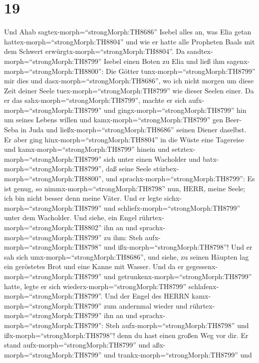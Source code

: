 \hypertarget{section-18}{%
\section{19}\label{section-18}}

 Und Ahab sagtex-morph=``strongMorph:TH8686'' Isebel alles
an, was Elia getan hattex-morph=``strongMorph:TH8804'' und wie er hatte
alle Propheten Baals mit dem Schwert
erwürgtx-morph=``strongMorph:TH8804''.  Da
sandtex-morph=``strongMorph:TH8799'' Isebel einen Boten zu Elia und ließ
ihm sagenx-morph=``strongMorph:TH8800'': Die Götter
tunx-morph=``strongMorph:TH8799'' mir dies und
dasx-morph=``strongMorph:TH8686'', wo ich nicht morgen um diese Zeit
deiner Seele tuex-morph=``strongMorph:TH8799'' wie dieser Seelen einer.
 Da er das sahx-morph=``strongMorph:TH8799'', machte er sich
aufx-morph=``strongMorph:TH8799'' und gingx-morph=``strongMorph:TH8799''
hin um seines Lebens willen und kamx-morph=``strongMorph:TH8799'' gen
Beer-Seba in Juda und ließx-morph=``strongMorph:TH8686'' seinen Diener
daselbst.  Er aber ging hinx-morph=``strongMorph:TH8804'' in
die Wüste eine Tagereise und kamx-morph=``strongMorph:TH8799'' hinein
und setztex-morph=``strongMorph:TH8799'' sich unter einen Wacholder und
batx-morph=``strongMorph:TH8799'', daß seine Seele
stürbex-morph=``strongMorph:TH8800'', und
sprachx-morph=``strongMorph:TH8799'': Es ist genug, so
nimmx-morph=``strongMorph:TH8798'' nun, HERR, meine Seele; ich bin nicht
besser denn meine Väter.  Und er legte
sichx-morph=``strongMorph:TH8799'' und
schliefx-morph=``strongMorph:TH8799'' unter dem Wacholder. Und siehe,
ein Engel rührtex-morph=``strongMorph:TH8802'' ihn an und
sprachx-morph=``strongMorph:TH8799'' zu ihm: Steh
aufx-morph=``strongMorph:TH8798'' und ißx-morph=``strongMorph:TH8798''!
 Und er sah sich umx-morph=``strongMorph:TH8686'', und
siehe, zu seinen Häupten lag ein geröstetes Brot und eine Kanne mit
Wasser. Und da er gegessenx-morph=``strongMorph:TH8799'' und
getrunkenx-morph=``strongMorph:TH8799'' hatte, legte er sich
wiederx-morph=``strongMorph:TH8799''
schlafenx-morph=``strongMorph:TH8799''.  Und der Engel des
HERRN kamx-morph=``strongMorph:TH8799'' zum andernmal wieder und
rührtex-morph=``strongMorph:TH8799'' ihn an und
sprachx-morph=``strongMorph:TH8799'': Steh
aufx-morph=``strongMorph:TH8798'' und ißx-morph=``strongMorph:TH8798''!
denn du hast einen großen Weg vor dir.  Er stand
aufx-morph=``strongMorph:TH8799'' und aßx-morph=``strongMorph:TH8799''
und trankx-morph=``strongMorph:TH8799'' und
